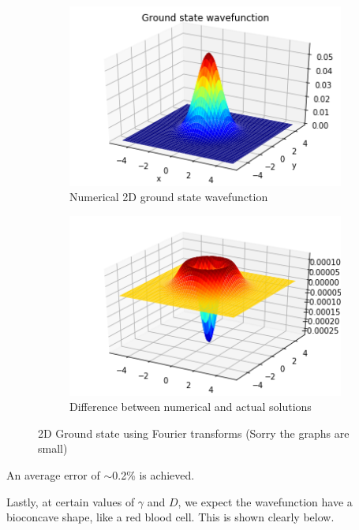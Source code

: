 \documentclass[10pt]{article}
\numberwithin{equation}{section}
\begin{document}
\begin{multicols}{2}
\begin{figure}[H]
		\centering
		\begin{subfigure}[H]{0.49\linewidth}
			\includegraphics[width=\linewidth]{2d gnd state}
			\caption{Numerical 2D ground state wavefunction}
		\end{subfigure}
		\begin{subfigure}[h]{0.49\linewidth}
			\includegraphics[width=\linewidth]{2d gnd state diff}
			\caption{Difference between numerical and actual solutions}
		\end{subfigure}
		\caption{2D Ground state using Fourier transforms (Sorry the graphs are small)}	
	\end{figure}
	
An average error of $\sim$0.2\% is achieved.


Lastly, at certain values of $\gamma$ and $D$, we expect the wavefunction have a bioconcave shape, like a red blood cell. This is shown clearly below.


\end{multicols}
\end{document}
